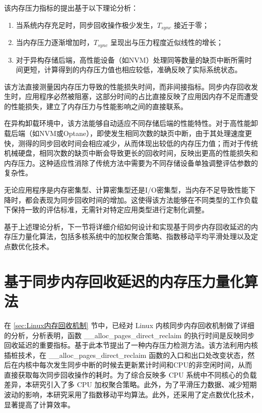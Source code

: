 该内存压力指标的提出基于以下理论分析：

\begin{enumerate}
    \item 当系统内存充足时，同步回收操作极少发生，\(T_{sync}\) 接近于零；
    \item 当内存压力逐渐增加时，\(T_{sync}\) 呈现出与压力程度近似线性的增长；
    \item 对于异构存储后端，高性能设备（如NVM）处理同等数量的缺页中断所需时间更短，计算得到的内存压力值也相应较低，准确反映了实际系统状态。
\end{enumerate}

该方法直接测量因内存压力导致的性能损失时间，而非间接指标。同步内存回收发生时，应用程序必然被阻塞，这部分时间的占比直接反映了应用因内存不足而遭受的性能损失，建立了内存压力与性能影响之间的直接联系。

在异构卸载环境中，该方法能够自动适应不同存储后端的性能特性。对于高性能卸载后端（如NVM或Optane），即使发生相同次数的缺页中断，由于其处理速度更快，测得的同步回收时间会相应减少，从而体现出较低的内存压力值；而对于传统机械硬盘，相同次数的缺页中断会导致更长的回收时间，反映出更高的性能损失和内存压力。这种适应性消除了传统方法中需要为不同存储设备单独调整评估参数的复杂性。

无论应用程序是内存密集型、计算密集型还是I/O密集型，当内存不足导致性能下降时，都会表现为同步回收时间的增加。这使得该方法能够在不同类型的工作负载下保持一致的评估标准，无需针对特定应用类型进行定制化调整。

基于上述理论分析，下一节将详细介绍如何设计和实现基于同步内存回收延迟的内存压力量化算法，包括多核系统中的加权聚合策略、指数移动平均平滑处理以及定点数优化技术。

\section{基于同步内存回收延迟的内存压力量化算法}
\label{sec:基于同步内存回收延迟的内存压力量化算法}

在 \ref{sec:Linux内存回收机制} 节中，已经对 Linux 内核同步内存回收机制做了详细的分析，分析表明，函数 \_\_alloc\_pages\_direct\_reclaim 的执行时间是反映同步回收延迟的重要指标。基于此本节提出了一种内存压力检测方法。该方法利用内核插桩技术，在 \_\_alloc\_pages\_direct\_reclaim 函数的入口和出口处改变状态，然后在内核中每次发生同步中断的时候去更新累计时间和CPU的非空闲时间，从而直接获取每次同步回收操作的耗时。为了综合反映多 CPU 系统中不同核心的负载差异，本研究引入了多 CPU 加权聚合策略。此外，为了平滑压力数据、减少短期波动的影响，本研究采用了指数移动平均算法。此外，还采用了定点数优化技术，显著提高了计算效率。


